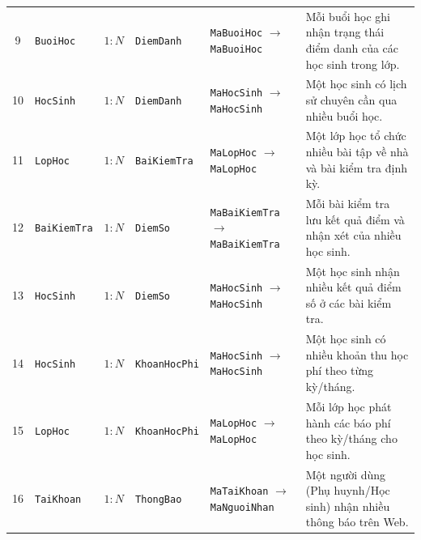\documentclass[12pt,a4paper]{article}
\begin{document}
{\begin{longtable}{@{}c >{\raggedright\arraybackslash}p{2.0cm} c >{\raggedright\arraybackslash}p{2.0cm} >{\raggedright\arraybackslash}p{3.6cm} >{\raggedright\arraybackslash}p{4.5cm}@{}}
9 & \texttt{BuoiHoc} & $1 : N$ & \texttt{DiemDanh} & \texttt{MaBuoiHoc} $\rightarrow$ \texttt{MaBuoiHoc} & Mỗi buổi học ghi nhận trạng thái điểm danh của các học sinh trong lớp. \\
10 & \texttt{HocSinh} & $1 : N$ & \texttt{DiemDanh} & \texttt{MaHocSinh} $\rightarrow$ \texttt{MaHocSinh} & Một học sinh có lịch sử chuyên cần qua nhiều buổi học. \\
11 & \texttt{LopHoc} & $1 : N$ & \texttt{BaiKiemTra} & \texttt{MaLopHoc} $\rightarrow$ \texttt{MaLopHoc} & Một lớp học tổ chức nhiều bài tập về nhà và bài kiểm tra định kỳ. \\
12 & \texttt{BaiKiemTra} & $1 : N$ & \texttt{DiemSo} & \texttt{MaBaiKiemTra} $\rightarrow$ \texttt{MaBaiKiemTra} & Mỗi bài kiểm tra lưu kết quả điểm và nhận xét của nhiều học sinh. \\
13 & \texttt{HocSinh} & $1 : N$ & \texttt{DiemSo} & \texttt{MaHocSinh} $\rightarrow$ \texttt{MaHocSinh} & Một học sinh nhận nhiều kết quả điểm số ở các bài kiểm tra. \\
14 & \texttt{HocSinh} & $1 : N$ & \texttt{KhoanHocPhi} & \texttt{MaHocSinh} $\rightarrow$ \texttt{MaHocSinh} & Một học sinh có nhiều khoản thu học phí theo từng kỳ/tháng. \\
15 & \texttt{LopHoc} & $1 : N$ & \texttt{KhoanHocPhi} & \texttt{MaLopHoc} $\rightarrow$ \texttt{MaLopHoc} & Mỗi lớp học phát hành các báo phí theo kỳ/tháng cho học sinh. \\
16 & \texttt{TaiKhoan} & $1 : N$ & \texttt{ThongBao} & \texttt{MaTaiKhoan} $\rightarrow$ \texttt{MaNguoiNhan} & Một người dùng (Phụ huynh/Học sinh) nhận nhiều thông báo trên Web. \\
\bottomrule
\end{longtable}
}
\end{document}
